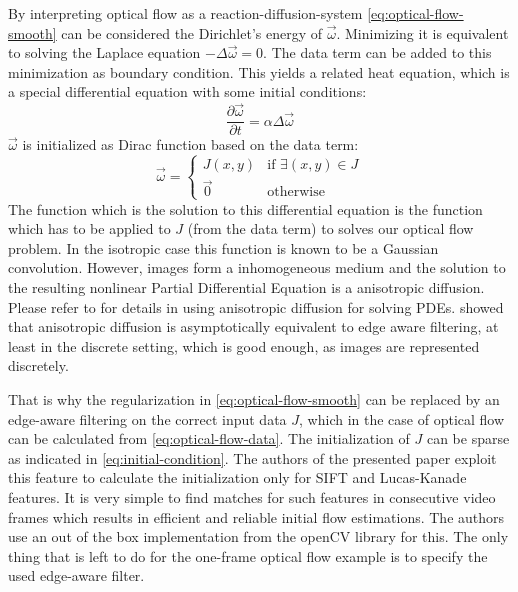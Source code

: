 \documentclass{utue} %
\begin{document}
By interpreting optical flow as a reaction-diffusion-system
\autoref{eq:optical-flow-smooth} can be considered the Dirichlet's energy of
$\vec{\omega}$. Minimizing it is equivalent to solving the Laplace equation
$-\Delta \vec{\omega} = 0$. The data term can be added to this minimization as
boundary condition. This yields a related heat equation, which is a special
differential equation with some initial conditions:
\begin{equation}
  \frac{\partial\vec{\omega}}{\partial t} = \alpha \Delta \vec{\omega}
  \label{eq:heat-equation}
\end{equation}
$\vec{\omega}$ is initialized as Dirac function based on the data term:
\begin{equation}
  \vec{\omega} = \begin{cases}
    J(x, y) & \text{if } \exists (x,y) \in J\\
    \vec{0} & \text{otherwise}
  \end{cases}
  \label{eq:initial-condition}
\end{equation}
The function which is the solution to this differential equation is the function
which has to be applied to $J$ (from the data term) to solves our optical flow
problem. In the isotropic case this function is known to be a Gaussian
convolution. However, images form a inhomogeneous medium and the solution to the
resulting nonlinear Partial Differential Equation is a anisotropic diffusion.
Please refer to \cite{Weickert:1998} for details in using anisotropic diffusion
for solving PDEs. \cite{paris2009bilateral} showed that anisotropic diffusion is
asymptotically equivalent to edge aware filtering, at least in the discrete
setting, which is good enough, as images are represented discretely.

That is why the regularization in \autoref{eq:optical-flow-smooth} can be
replaced by an edge-aware filtering on the correct input data $J$, which in the
case of optical flow can be calculated from \autoref{eq:optical-flow-data}.
The initialization of $J$ can be sparse as indicated in
\autoref{eq:initial-condition}. The authors of the presented paper exploit this
feature to calculate the initialization only for SIFT and Lucas-Kanade features.
It is very simple to find matches for such features in consecutive video frames
which results in efficient and reliable initial flow estimations.  The authors
use an out of the box implementation from the openCV library for this.  The only
thing that is left to do for the one-frame optical flow example is to specify
the used edge-aware filter.
\end{document}
